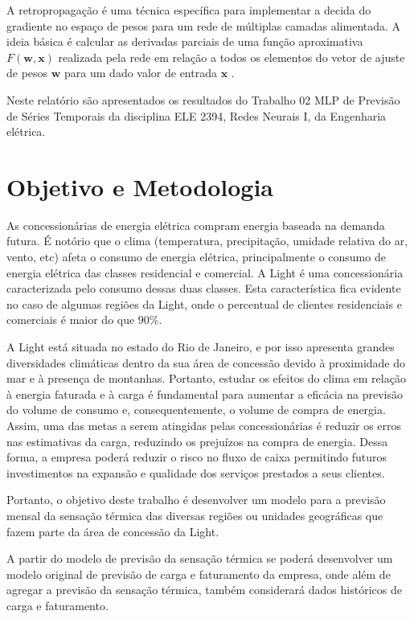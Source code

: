 \documentclass[journal, a4paper]{IEEEtran}
\begin{document}
	A retropropagação é uma técnica específica para implementar a decida do gradiente no espaço de pesos para um rede de múltiplas camadas alimentada. A ideia básica é calcular as derivadas parciais de uma função aproximativa $F(\textbf{w},\textbf{x})$ realizada pela rede em relação a todos os elementos do vetor de ajuste de pesos $\textbf{w}$ para um dado valor de entrada $\textbf{x}$ \citep{Haykin1999}.
	
	Neste relatório são apresentados os resultados do Trabalho 02 MLP de Previsão de Séries Temporais da disciplina ELE 2394, Redes Neurais I, da Engenharia elétrica.
	

\section{Objetivo e Metodologia}


As concessionárias de energia elétrica compram energia baseada na demanda futura. É notório que o clima (temperatura, precipitação, umidade relativa do ar, vento, etc) afeta o consumo de energia elétrica, principalmente o consumo de energia elétrica das classes residencial e comercial. A Light é uma concessionária caracterizada pelo consumo dessas duas classes. Esta característica fica evidente no caso de algumas regiões da Light, onde o percentual de clientes residenciais e comerciais é maior do que $90\%$.

A Light está situada no estado do Rio de Janeiro, e por isso apresenta grandes diversidades
climáticas dentro da sua área de concessão devido à proximidade do mar e à presença de montanhas. Portanto, estudar os efeitos do clima em relação à energia faturada e à carga é
fundamental para aumentar a eficácia na previsão do volume de consumo e, consequentemente, o
volume de compra de energia. Assim, uma das metas a serem atingidas pelas concessionárias é reduzir os erros nas estimativas da carga, reduzindo os prejuízos na compra de energia. Dessa forma, a empresa poderá reduzir o risco no fluxo de caixa permitindo futuros investimentos na expansão e qualidade dos serviços prestados a seus clientes.

Portanto, o objetivo deste trabalho é desenvolver um modelo para a previsão mensal da sensação
térmica das diversas regiões ou unidades geográficas que fazem parte da área de concessão da
Light.

A partir do modelo de previsão da sensação térmica se poderá desenvolver um modelo original de
previsão de carga e faturamento da empresa, onde além de agregar a previsão da sensação térmica, também considerará dados históricos de carga e faturamento.\\
\end{document}

